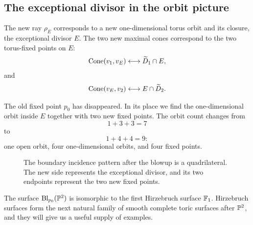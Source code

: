 \subsection{The exceptional divisor in the orbit picture}

The new ray \(\rho_E\) corresponds to a new one-dimensional torus
orbit and its closure, the exceptional divisor \(E\). The two new
maximal cones correspond to the two torus-fixed points on \(E\):
\[
\Cone{v_1,v_E}
\longleftrightarrow
\widetilde D_1\cap E,
\]
and
\[
\Cone{v_E,v_2}
\longleftrightarrow
E\cap\widetilde D_2.
\]

The old fixed point \(p_0\) has disappeared. In its place we find the
one-dimensional orbit inside \(E\) together with two new fixed points.
The orbit count changes from
\[
1+3+3=7
\]
to
\[
1+4+4=9:
\]
one open orbit, four one-dimensional orbits, and four fixed points.

\begin{figure}[ht]
\centering
{}
\caption{The boundary incidence pattern after the blowup is a
quadrilateral. The new side represents the exceptional divisor, and
its two endpoints represent the two new fixed points.}
\label{fig:p2-blowup-orbit-quadrilateral}
\end{figure}

\begin{observation}
The surface \(\Blp{\PP^2}{p_0}\) is isomorphic to the first Hirzebruch
surface \(\Hirz{1}\). Hirzebruch surfaces form the next natural family
of smooth complete toric surfaces after \(\PP^2\), and they will give
us a useful supply of examples.
\end{observation}

